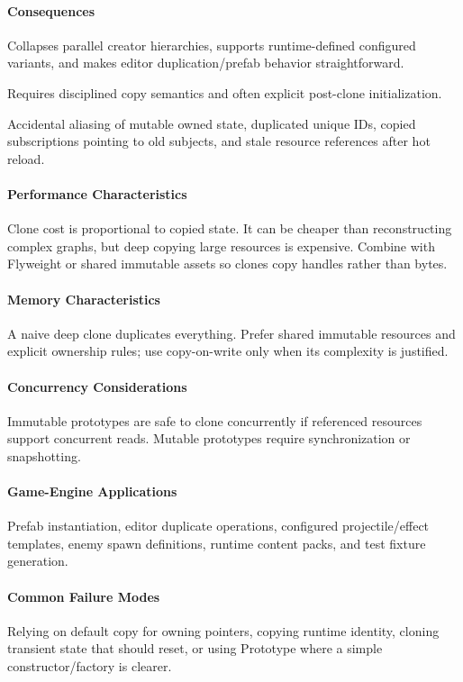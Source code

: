 \documentclass[11pt]{article}
\begin{document}
\paragraph{Consequences}
\begin{description}[leftmargin=2.7cm,style=nextline]
\item[Benefits] Collapses parallel creator hierarchies, supports runtime-defined configured variants, and makes editor duplication/prefab behavior straightforward.
\item[Costs] Requires disciplined copy semantics and often explicit post-clone initialization.
\item[Risks] Accidental aliasing of mutable owned state, duplicated unique IDs, copied subscriptions pointing to old subjects, and stale resource references after hot reload.
\end{description}
\paragraph{Performance Characteristics} Clone cost is proportional to copied state. It can be cheaper than reconstructing complex graphs, but deep copying large resources is expensive. Combine with Flyweight or shared immutable assets so clones copy handles rather than bytes.
\paragraph{Memory Characteristics} A naive deep clone duplicates everything. Prefer shared immutable resources and explicit ownership rules; use copy-on-write only when its complexity is justified.
\paragraph{Concurrency Considerations} Immutable prototypes are safe to clone concurrently if referenced resources support concurrent reads. Mutable prototypes require synchronization or snapshotting.
\paragraph{Game-Engine Applications} Prefab instantiation, editor duplicate operations, configured projectile/effect templates, enemy spawn definitions, runtime content packs, and test fixture generation.
\paragraph{Common Failure Modes} Relying on default copy for owning pointers, copying runtime identity, cloning transient state that should reset, or using Prototype where a simple constructor/factory is clearer.
\end{document}
